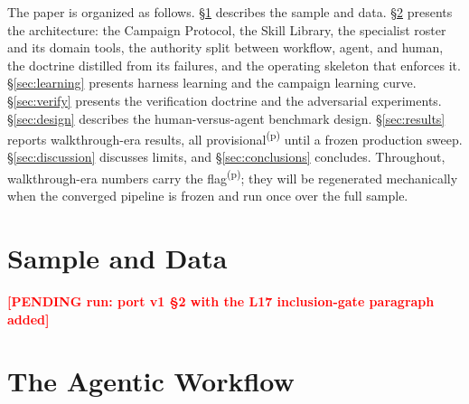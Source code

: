 \documentclass[twocolumn]{aastex631}
\newcommand{\PENDING}[1]{\textbf{\textcolor{red}{[PENDING run: #1]}}}
\newcommand{\prov}{\textsuperscript{(p)}}   %
\begin{document}
The paper is organized as follows. \S\ref{sec:sample} describes the sample
and data. \S\ref{sec:workflow} presents the architecture: the Campaign
Protocol, the Skill Library, the specialist roster and its domain tools,
the authority split between workflow, agent, and human, the doctrine
distilled from its failures, and the operating skeleton that enforces it.
\S\ref{sec:learning} presents harness learning and the campaign learning
curve. \S\ref{sec:verify} presents the verification doctrine and the
adversarial experiments. \S\ref{sec:design} describes the human-versus-agent
benchmark design. \S\ref{sec:results} reports walkthrough-era results, all
provisional\prov{} until a frozen production sweep. \S\ref{sec:discussion}
discusses limits, and \S\ref{sec:conclusions} concludes. Throughout,
walkthrough-era numbers carry the flag\prov{}; they will be regenerated
mechanically when the converged pipeline is frozen and run once over the
full sample.

\section{Sample and Data} \label{sec:sample}
\PENDING{port v1 \S2 with the L17 inclusion-gate paragraph added}

\section{The Agentic Workflow} \label{sec:workflow}
\end{document}

